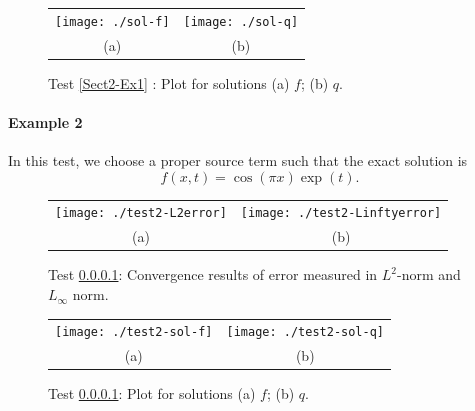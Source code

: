 \documentclass[final,leqno]{siamltex704}
\begin{document}
\begin{figure}[h!]
\centering
\begin{tabular}{cc}
  \texttt{[image: ./sol-f]}&
   \texttt{[image: ./sol-q]} \\
  \footnotesize (a) & \footnotesize(b) 
\end{tabular}
\caption{Test \ref{Sect2-Ex1} : Plot for solutions (a) $f$; (b) $q$.}
\end{figure}

%
%

\paragraph{Example 2}\label{Sect2-Ex2}
In this test, we choose a proper source term such that the exact solution is 
$$f(x,t)=\cos(\pi x)\exp(t).$$

\begin{figure}[h!]
\centering
\begin{tabular}{cc}
  \texttt{[image: ./test2-L2error]}&
   \texttt{[image: ./test2-Linftyerror]} \\
  \footnotesize (a) & \footnotesize(b) 
\end{tabular}
\caption{Test \ref{Sect2-Ex2}: Convergence results of error measured in $L^2$-norm and $L_{\infty}$ norm.}
\end{figure}

\begin{figure}[h!]
\centering
\begin{tabular}{cc}
  \texttt{[image: ./test2-sol-f]}&
   \texttt{[image: ./test2-sol-q]} \\
  \footnotesize (a) & \footnotesize(b) 
\end{tabular}
\caption{Test \ref{Sect2-Ex2}: Plot for solutions (a) $f$; (b) $q$.}
\end{figure}

\end{document}

